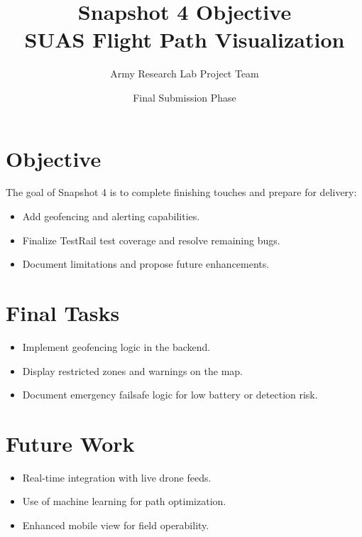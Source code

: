 \documentclass[12pt]{article}
\title{Snapshot 4 Objective\\SUAS Flight Path Visualization}
\author{Army Research Lab Project Team}
\date{Final Submission Phase}
\begin{document}
\maketitle

\section{Objective}
The goal of Snapshot 4 is to complete finishing touches and prepare for delivery:
\begin{itemize}
  \item Add geofencing and alerting capabilities.
  \item Finalize TestRail test coverage and resolve remaining bugs.
  \item Document limitations and propose future enhancements.
\end{itemize}

\section{Final Tasks}
\begin{itemize}
  \item Implement geofencing logic in the backend.
  \item Display restricted zones and warnings on the map.
  \item Document emergency failsafe logic for low battery or detection risk.
\end{itemize}

\section{Future Work}
\begin{itemize}
  \item Real-time integration with live drone feeds.
  \item Use of machine learning for path optimization.
  \item Enhanced mobile view for field operability.
\end{itemize}
\end{document}
